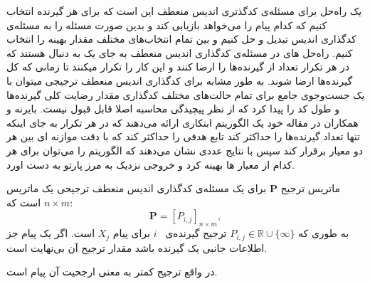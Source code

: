  یک راه‌حل 
 برای مسئله‌ی کدگذتری اندیس منعطف این است که برای هر گیرنده انتخاب کنیم که کدام پیام را می‌خواهد بازیابی کند و بدین صورت مسئله را به مسئله‌ی کدگذاری اندیس تبدیل و حل کنیم و بین تمام انتخاب‌های مختلف مقدار بهینه را انتخاب کنیم.  راه‌حل های
 در مسئله‌ی کدگذاری اندیس منعطف به جای یک 
به دنبال 
هستند که در هر تکرار تعداد
از گیرنده‌ها را ارضا کنند و این کار را تکرار میکنند تا زمانی که کل گیرنده‌ها ارضا شوند. به طور مشابه برای کدگذاری اندیس منعطف ترجیجی میتوان با یک جست‌وجوی جامع برای تمام حالت‌های مختلف کدگذاری مقدار رضایت کلی گیرنده‌ها و طول کد را پیدا کرد که از نظر پیچیدگی محاسبه اصلا قابل قبول نیست. بایرنه و همکاران در مقاله خود یک الگوریتم ابتکاری ارائه می‌دهند که در هر تکرار به جای اینکه تنها تعداد گیرنده‌ها را حداکثر کند تابع هدفی را حداکثر کند که با دقت موازنه ای بین هر دو معیار برقرار کند سپس با نتایج عددی نشان می‌دهند که الگوریتم را می‌توان برای هر کدام از معیار ها بهینه کرد و خروجی نزدیک به مرز پارتو به دست اورد.
\begin{definition}
	ماتریس ترجیح
	$\boldsymbol{P}$ 
	برای یک مسئله‌ی کدگذاری اندیس منعطف ترجیحی یک ماتریس
	 $n\times m$
	 است که:
	\begin{equation}
		\boldsymbol{P} = [P_{i,j}]_{n\times m},
	\end{equation}
	به طوری که
	 $P_{i,j}\in\mathbb{R}\cup\{\infty\}$ 
	 ترجیح گیرنده‌ی
	 ~$i$
	 برای پیام
	  $X_j$
	  است.
	اگر یک پیام جز اطلاعات جانبی یک گیرنده باشد مقدار ترجیح آن بی‌نهایت است.
	
	در واقع ترجیح کمتر به معنی ارجحیت آن پیام است.
\end{definition}

